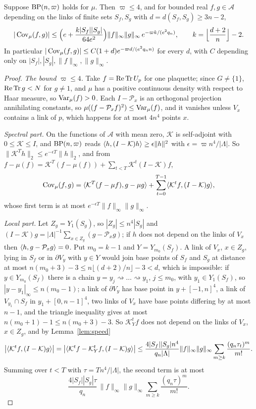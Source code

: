 \begin{theorem}\label{thm:decay}
Suppose $\mathrm{BP}(n,\varpi)$ holds for $\mu$. Then $\varpi\le4$, and for bounded
real $f,g\in\mathcal A$ depending on the links of finite sets $S_f,S_g$ with
$d=d(S_f,S_g)\ge3n-2$,
\[
|\operatorname{Cov}_\mu(f,g)|\le\Bigl(e+\frac{k|S_f||S_g|}{64e^2}\Bigr)\|f\|_\infty\|g\|_\infty\,
e^{-\varpi k/(e^2q_n)},\qquad k=\Bigl\lfloor\frac{d+2}n\Bigr\rfloor-2 .
\]
In particular $|\operatorname{Cov}_\mu(f,g)|\le C(1+d)e^{-\varpi d/(e^2q_nn)}$ for every $d$,
with $C$ depending only on $|S_f|,|S_g|,\|f\|_\infty,\|g\|_\infty$.
\end{theorem}

\begin{proof}
\emph{The bound $\varpi\le4$.} Take $f=\operatorname{Re}\operatorname{Tr} U_p$ for one plaquette; since
$G\ne\{1\}$, $\operatorname{Re}\operatorname{Tr} g<N$ for $g\ne1$, and $\mu$ has a positive continuous
density with respect to Haar measure, so $\operatorname{Var}_\mu(f)>0$. Each
$I-\mathcal P_x$ is an orthogonal projection annihilating constants, so
$\mu((f-\mathcal P_xf)^2)\le\operatorname{Var}_\mu(f)$, and it vanishes unless $V_x$ contains
a link of $p$, which happens for at most $4n^4$ points $x$.

\emph{Spectral part.} On the functions of $\mathcal A$ with mean zero, $\mathcal K$
is self-adjoint with $0\le\mathcal K\le I$, and $\mathrm{BP}(n,\varpi)$ reads
$\langle h,(I-\mathcal K)h\rangle\ge\epsilon\|h\|^2$ with $\epsilon=\varpi n^4/|\Lambda|$. So
$\|\mathcal K^Th\|_2\le e^{-\epsilon T}\|h\|_2$, and from
$f-\mu(f)=\mathcal K^T(f-\mu(f))+\sum_{t<T}\mathcal K^t(I-\mathcal K)f$,
\[
\operatorname{Cov}_\mu(f,g)=\langle \mathcal K^T(f-\mu f),g-\mu g\rangle+\sum_{t=0}^{T-1}
\langle \mathcal K^tf,(I-\mathcal K)g\rangle,
\]
whose first term is at most $e^{-\epsilon T}\|f\|_\infty\|g\|_\infty$.

\emph{Local part.} Let $Z_g=Y_1(S_g)$, so $|Z_g|\le n^4|S_g|$ and $(I-\mathcal K)g=
|\Lambda|^{-1}\sum_{x\in Z_g}(g-\mathcal P_xg)$; if $h$ does not depend on the links of
$V_x$ then $\langle h,g-\mathcal P_xg\rangle=0$. Put $m_0=k-1$ and $Y=Y_{m_0}(S_f)$. A link
of $V_x$, $x\in Z_g$, lying in $S_f$ or in $\partial V_y$ with $y\in Y$ would join
base points of $S_f$ and $S_g$ at distance at most $n(m_0+3)-3\le n\lfloor
(d+2)/n\rfloor-3<d$, which is impossible: if $y\in Y_{m_0}(S_f)$ there is a
chain $y=y_j\rightsquigarrow\dots\rightsquigarrow y_1$, $j\le m_0$, with $y_1
\in Y_1(S_f)$, so $|y-y_1|_\infty\le n(m_0-1)$; a link of $\partial V_y$ has
base point in $y+[-1,n]^4$, a link of $V_{y_1}\cap S_f$ in $y_1+[0,n-1]^4$,
two links of $V_x$ have base points differing by at most $n-1$, and the
triangle inequality gives at most $n(m_0+1)-1\le n(m_0+3)-3$. So $\mathcal K_Y^tf$ does not depend on
the links of $V_x$, $x\in Z_g$, and by Lemma~\ref{lem:speed}
\[
\bigl|\langle \mathcal K^tf,(I-\mathcal K)g\rangle\bigr|=\bigl|\langle \mathcal K^tf-\mathcal K_Y^tf,(I-\mathcal K)g\rangle\bigr|\le\frac{4|S_f||S_g|n^4}{q_n|\Lambda|}\|f\|_\infty\|g\|_\infty
\sum_{m\ge k}\frac{(q_n\tau_t)^m}{m!}.
\]
Summing over $t<T$ with $\tau=Tn^4/|\Lambda|$, the second term is at most
\[
\frac{4|S_f||S_g|\tau}{q_n}\,\|f\|_\infty\|g\|_\infty\sum_{m\ge k}
\frac{(q_n\tau)^m}{m!}.
\]


\end{proof}
